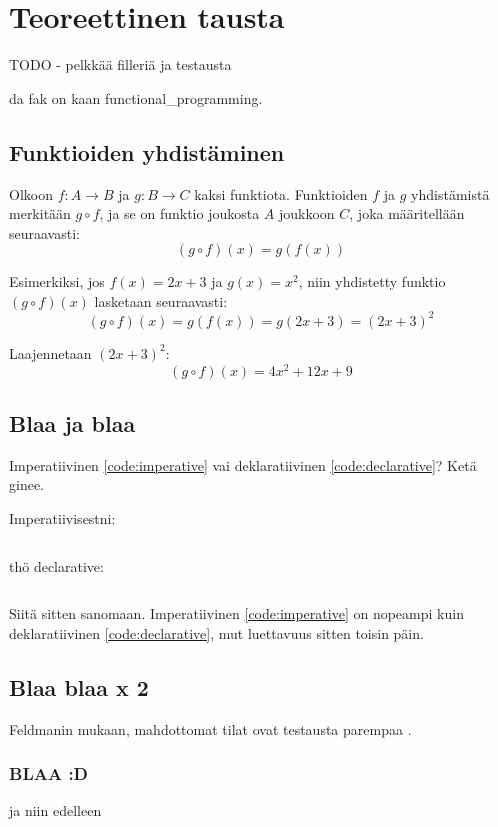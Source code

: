 \vspace{21.5pt} %
\chapter{Teoreettinen tausta}

TODO - pelkkää filleriä ja testausta

da fak on kaan \gls{functional_programming}.

\section{Funktioiden yhdistäminen}

Olkoon \( f: A \rightarrow B \) ja \( g: B \rightarrow C \) kaksi funktiota. Funktioiden \( f \) ja \( g \) yhdistämistä merkitään \( g \circ f \), ja se on funktio joukosta \( A \) joukkoon \( C \), joka määritellään seuraavasti:
\[
  (g \circ f)(x) = g(f(x))
\]

Esimerkiksi, jos \( f(x) = 2x + 3 \) ja \( g(x) = x^2 \), niin yhdistetty funktio \( (g \circ f)(x) \) lasketaan seuraavasti:
\[
  (g \circ f)(x) = g(f(x)) = g(2x + 3) = (2x + 3)^2
\]

Laajennetaan \( (2x + 3)^2 \):
\[
  (g \circ f)(x) = 4x^2 + 12x + 9
\]

\section{Blaa ja blaa}

Imperatiivinen \ref{code:imperative} vai deklaratiivinen \ref{code:declarative}? Ketä ginee.

Imperatiivisestni:

\begin{code}
  \inputminted{javascript}{code/imperative.js}
  \label{code:imperative}
\end{code}

thö declarative:

\begin{code}
  \inputminted{javascript}{code/declarative.js}
  \label{code:declarative}
\end{code}


Siitä sitten sanomaan. Imperatiivinen \ref{code:imperative} on nopeampi kuin deklaratiivinen \ref{code:declarative}, mut luettavuus sitten toisin päin.

\section{Blaa blaa x 2}

Feldmanin mukaan, mahdottomat tilat ovat testausta parempaa \cite{impossiblebetter}.

\subsection{BLAA :D}
ja niin edelleen